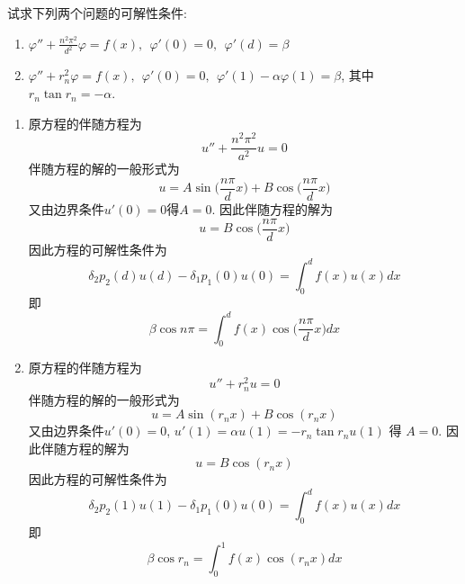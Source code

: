 \begin{problem}[习题7.15]
试求下列两个问题的可解性条件:
\begin{enumerate}
\item $\displaystyle \varphi''+\frac{n^2\pi^2}{d^2}\varphi=f(x), ~~ \varphi'(0)=0,~~\varphi'(d)=\beta$
\item $\displaystyle \varphi''+r_n^2\varphi=f(x), ~~\varphi'(0)=0, ~~ \varphi'(1)-\alpha\varphi(1)=\beta$, 其中 $r_n\tan r_n = -\alpha$.
\end{enumerate}
\end{problem}

\begin{solution}
\begin{enumerate}
\item 原方程的伴随方程为
\[
u'' + \frac{n^2\pi^2}{a^2}u = 0
\]
伴随方程的解的一般形式为
\[
u = A\sin\Big(\frac{n\pi}{d}x\Big) + B\cos\Big(\frac{n\pi}{d}x\Big)
\]
又由边界条件$u'(0) = 0$得$A=0$. 因此伴随方程的解为
\[
u = B\cos\Big(\frac{n\pi}{d}x\Big)
\]
因此方程的可解性条件为
\[
\delta_2p_2(d)u(d)-\delta_1p_1(0)u(0) = \int_0^df(x)u(x)dx
\]
即
\[
\beta\cos n\pi = \int_0^df(x)\cos\Big(\frac{n\pi}{d}x\Big)dx
\]

\item 原方程的伴随方程为
\[
u'' + r_n^2u = 0
\]
伴随方程的解的一般形式为
\[
u = A\sin(r_n x) + B\cos(r_n x)
\]
又由边界条件$u'(0) = 0$, $u'(1)=\alpha u(1)=-r_n\tan r_nu(1)$ 得 $A=0$. 因此伴随方程的解为
\[
u = B\cos(r_nx)
\]
因此方程的可解性条件为
\[
\delta_2p_2(1)u(1)-\delta_1p_1(0)u(0) = \int_0^df(x)u(x)dx
\]
即
\[
\beta\cos r_n = \int_0^1 f(x)\cos(r_nx)dx
\]
\end{enumerate}
\end{solution} 
